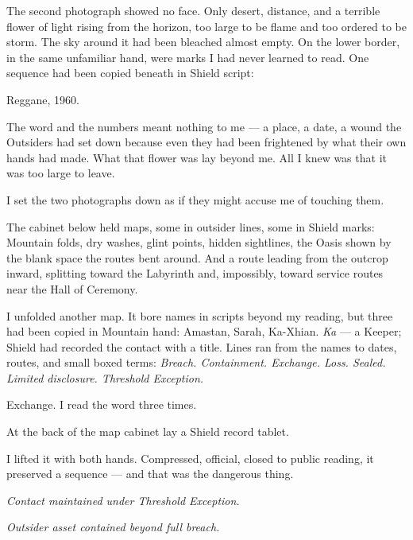 The second photograph showed no face. Only desert, distance, and a terrible flower of light rising from the horizon, too large to be flame and too ordered to be storm. The sky around it had been bleached almost empty. On the lower border, in the same unfamiliar hand, were marks I had never learned to read. One sequence had been copied beneath in Shield script:\par

Reggane, 1960.\par

The word and the numbers meant nothing to me --- a place, a date, a wound the Outsiders had set down because even they had been frightened by what their own hands had made. What that flower was lay beyond me. All I knew was that it was too large to leave.\par

I set the two photographs down as if they might accuse me of touching them.\par

The cabinet below held maps, some in outsider lines, some in Shield marks: Mountain folds, dry washes, glint points, hidden sightlines, the Oasis shown by the blank space the routes bent around. And a route leading from the outcrop inward, splitting toward the Labyrinth and, impossibly, toward service routes near the Hall of Ceremony.\par

I unfolded another map. It bore names in scripts beyond my reading, but three had been copied in Mountain hand: Amastan, Sarah, Ka-Xhian. \emph{Ka} --- a Keeper; Shield had recorded the contact with a title. Lines ran from the names to dates, routes, and small boxed terms: \textit{Breach. Containment. Exchange. Loss. Sealed. Limited disclosure. Threshold Exception.}\par

Exchange. I read the word three times.\par

At the back of the map cabinet lay a Shield record tablet.\par

I lifted it with both hands. Compressed, official, closed to public reading, it preserved a sequence --- and that was the dangerous thing.\par

\textit{Contact maintained under Threshold Exception.}\par

\textit{Outsider asset contained beyond full breach.}\par

